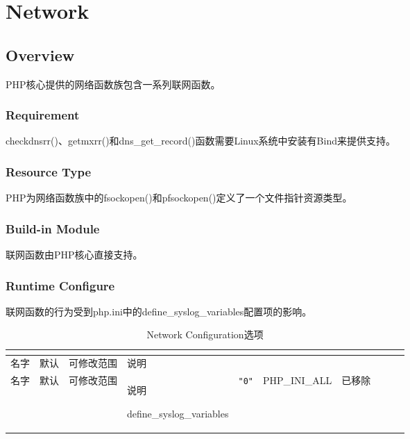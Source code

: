 \part{Network}



\chapter{Overview}



PHP核心提供的网络函数族包含一系列联网函数。

\section{Requirement}

checkdnsrr()、getmxrr()和dns\_get\_record()函数需要Linux系统中安装有Bind来提供支持。

\section{Resource Type}

PHP为网络函数族中的fsockopen()和pfsockopen()定义了一个文件指针资源类型。


\section{Build-in Module}

联网函数由PHP核心直接支持。

\section{Runtime Configure}

联网函数的行为受到php.ini中的define\_syslog\_variables配置项的影响。



\begin{longtable}{|m{100pt}|m{30pt}|m{50pt}|m{100pt}|}
\tabularnewline\hline
名字&默认&可修改范围&说明
\endhead

\caption{Network Configuration选项}\\
\hline
名字&默认&可修改范围&说明
\endfirsthead

\endfoot

\endlastfoot
\hline
define\_syslog\_variables&\texttt{"0"}&PHP\_INI\_ALL&已移除\\
\hline
\end{longtable}

